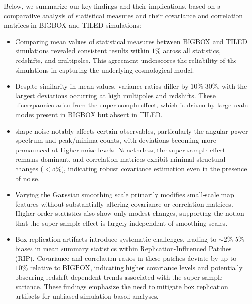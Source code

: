 Below, we summarize our key findings and their implications, based on a comparative analysis of statistical measures and their covariance and correlation matrices in BIGBOX and TILED simulations:
\begin{itemize} 
    \item Comparing mean values of statistical measures between BIGBOX and TILED simulations revealed consistent results within $1\%$ across all statistics, redshifts, and multipoles. This agreement underscores the reliability of the simulations in capturing the underlying cosmological model. 
    \item Despite similarity in mean values, variance ratios differ by $10\%$-$30\%$, with the largest deviations occurring at high multipoles and redshifts. These discrepancies arise from the super-sample effect, which is driven by large-scale modes present in BIGBOX but absent in TILED.
    \item shape noise notably affects certain observables, particularly the angular power spectrum and peak/minima counts, with deviations becoming more pronounced at higher noise levels. Nonetheless, the super-sample effect remains dominant, and correlation matrices exhibit minimal structural changes ($<5\%$), indicating robust covariance estimation even in the presence of noise.
    \item Varying the Gaussian smoothing scale primarily modifies small-scale map features without substantially altering covariance or correlation matrices. Higher-order statistics also show only modest changes, supporting the notion that the super-sample effect is largely independent of smoothing scales.
    \item Box replication artifacts introduce systematic challenges, leading to $\sim 2\%$-$5\%$ biases in mean summary statistics within Replication-Influenced Patches (RIP). Covariance and correlation ratios in these patches deviate by up to $10\%$ relative to BIGBOX, indicating higher covariance levels and potentially obscuring redshift-dependent trends associated with the super-sample variance. These findings emphasize the need to mitigate box replication artifacts for unbiased simulation-based analyses.
\end{itemize}


